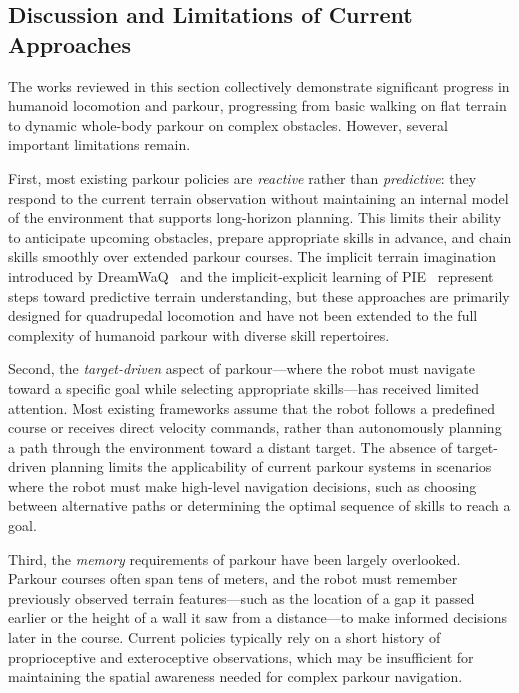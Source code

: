 \subsection{Discussion and Limitations of Current Approaches}

The works reviewed in this section collectively demonstrate significant progress in humanoid locomotion and parkour, progressing from basic walking on flat terrain to dynamic whole-body parkour on complex obstacles. However, several important limitations remain.

First, most existing parkour policies are \emph{reactive} rather than \emph{predictive}: they respond to the current terrain observation without maintaining an internal model of the environment that supports long-horizon planning. This limits their ability to anticipate upcoming obstacles, prepare appropriate skills in advance, and chain skills smoothly over extended parkour courses. The implicit terrain imagination introduced by DreamWaQ~\cite{nahraendra2024dreamwaq} and the implicit-explicit learning of PIE~\cite{luo2024pie} represent steps toward predictive terrain understanding, but these approaches are primarily designed for quadrupedal locomotion and have not been extended to the full complexity of humanoid parkour with diverse skill repertoires.

Second, the \emph{target-driven} aspect of parkour---where the robot must navigate toward a specific goal while selecting appropriate skills---has received limited attention. Most existing frameworks assume that the robot follows a predefined course or receives direct velocity commands, rather than autonomously planning a path through the environment toward a distant target. The absence of target-driven planning limits the applicability of current parkour systems in scenarios where the robot must make high-level navigation decisions, such as choosing between alternative paths or determining the optimal sequence of skills to reach a goal.

Third, the \emph{memory} requirements of parkour have been largely overlooked. Parkour courses often span tens of meters, and the robot must remember previously observed terrain features---such as the location of a gap it passed earlier or the height of a wall it saw from a distance---to make informed decisions later in the course. Current policies typically rely on a short history of proprioceptive and exteroceptive observations, which may be insufficient for maintaining the spatial awareness needed for complex parkour navigation.

